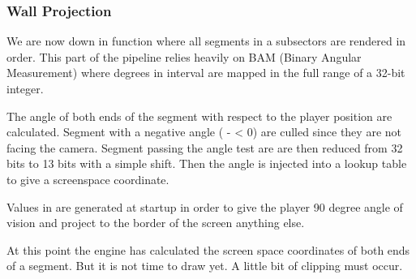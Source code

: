 \subsubsection{Wall Projection}
We are now down in  function where all segments in a subsectors are rendered in order. This part of the pipeline relies heavily on BAM (Binary Angular Measurement) where degrees in interval \cw{[0, 360]} are mapped in the full range of a 32-bit integer.\\
\par
{}
\par
The angle of both ends of the segment with respect to the player position are calculated. Segment with a negative angle ( -  < 0) are culled since they are not facing the camera. Segment passing the angle test are are then reduced from 32 bits to 13 bits with a simple shift. Then the angle is injected into a lookup table  to give a screenspace  coordinate.\\
 \par
\vspace{2mm}
\par
Values in  are generated at startup in order to give the player 90 degree angle of vision and project to the border of the screen anything else. 
\par
\vspace{1cm}
\par
At this point the engine has calculated the screen space  coordinates of both ends of a segment. But it is not time to draw yet. A little bit of clipping must occur. 






